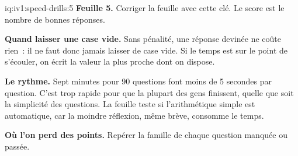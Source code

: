 \begin{solution}{iq:iv1:speed-drills:5}
\textbf{Feuille 5.} Corriger la feuille avec cette clé. Le score est le nombre de bonnes réponses.
\par\nopagebreak


\textbf{Quand laisser une case vide.} Sans pénalité, une réponse devinée ne coûte rien~: il ne faut donc jamais laisser de case vide. Si le temps est sur le point de s'écouler, on écrit la valeur la plus proche dont on dispose.

\textbf{Le rythme.} Sept minutes pour 90 questions font moins de 5 secondes par question. C'est trop rapide pour que la plupart des gens finissent, quelle que soit la simplicité des questions. La feuille teste si l'arithmétique simple est automatique, car la moindre réflexion, même brève, consomme le temps.

\textbf{Où l'on perd des points.} Repérer la famille de chaque question manquée ou passée.


\end{solution}

